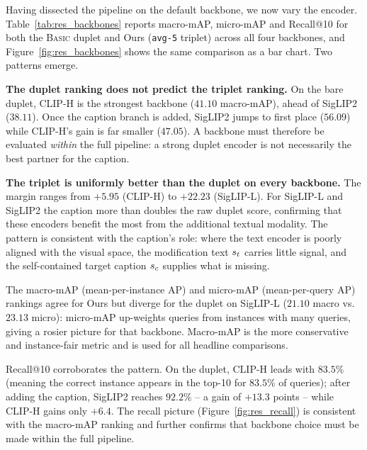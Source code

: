 Having dissected the pipeline on the default backbone, we now vary the encoder.
Table~\ref{tab:res_backbones} reports macro-mAP, micro-mAP and Recall@10 for both
the \textsc{Basic} duplet and Ours (\texttt{avg-5} triplet) across all four
backbones, and Figure~\ref{fig:res_backbones} shows the same comparison as a bar
chart. Two patterns emerge.

\textbf{The duplet ranking does not predict the triplet ranking.}
On the bare duplet, CLIP-H is the strongest backbone ($41.10$ macro-mAP), ahead of
SigLIP2 ($38.11$). Once the caption branch is added, SigLIP2 jumps to first
place ($56.09$) while CLIP-H's gain is far smaller ($47.05$). A backbone must
therefore be evaluated \emph{within} the full pipeline: a strong duplet encoder
is not necessarily the best partner for the caption.

\textbf{The triplet is uniformly better than the duplet on every backbone.}
The margin ranges from $+5.95$ (CLIP-H) to $+22.23$ (SigLIP-L). For SigLIP-L and
SigLIP2 the caption more than doubles the raw duplet score, confirming that these
encoders benefit the most from the additional textual modality. The pattern is
consistent with the caption's role: where the text encoder is poorly aligned with
the visual space, the modification text $\st$ carries little signal, and the
self-contained target caption $\sc$ supplies what is missing.

The macro-mAP (mean-per-instance AP) and micro-mAP (mean-per-query AP) rankings
agree for Ours but diverge for the duplet on SigLIP-L ($21.10$ macro vs.\
$23.13$ micro): micro-mAP up-weights queries from instances with many queries,
giving a rosier picture for that backbone. Macro-mAP is the more conservative
and instance-fair metric and is used for all headline comparisons.

Recall@10 corroborates the pattern. On the duplet, CLIP-H leads with $83.5\%$
(meaning the correct instance appears in the top-10 for $83.5\%$ of queries);
after adding the caption, SigLIP2 reaches $92.2\%$ -- a gain of $+13.3$ points --
while CLIP-H gains only $+6.4$. The recall picture (Figure~\ref{fig:res_recall})
is consistent with the macro-mAP ranking and further confirms that backbone choice
must be made within the full pipeline.

